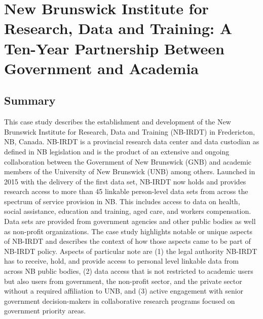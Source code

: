 \hypertarget{nbirdt}{%
\chapter{New Brunswick Institute for Research, Data and Training: A Ten-Year Partnership Between Government and Academia}\label{nbirdt}}

\hrulefill

\hypertarget{nbirdt-summ}{%
\section{Summary}\label{nbirdt-summ}}

This case study describes the establishment and development of the New Brunswick Institute for Research, Data and Training (NB-IRDT) in Fredericton, NB, Canada. NB-IRDT is a provincial research data center and data custodian as defined in NB legislation and is the product of an extensive and ongoing collaboration between the Government of New Brunswick (GNB) and academic members of the University of New Brunswick (UNB) among others. Launched in 2015 with the delivery of the first data set, NB-IRDT now holds and provides research access to more than 45 linkable person-level data sets from across the spectrum of service provision in NB. This includes access to data on health, social assistance, education and training, aged care, and workers compensation. Data sets are provided from government agencies and other public bodies as well as non-profit organizations. The case study highlights notable or unique aspects of NB-IRDT and describes the context of how those aspects came to be part of NB-IRDT policy. Aspects of particular note are (1) the legal authority NB-IRDT has to receive, hold, and provide access to personal level linkable data from across NB public bodies, (2) data access that is not restricted to academic users but also users from government, the non-profit sector, and the private sector without a required affiliation to UNB, and (3) active engagement with senior government decision-makers in collaborative research programs focused on government priority areas.

